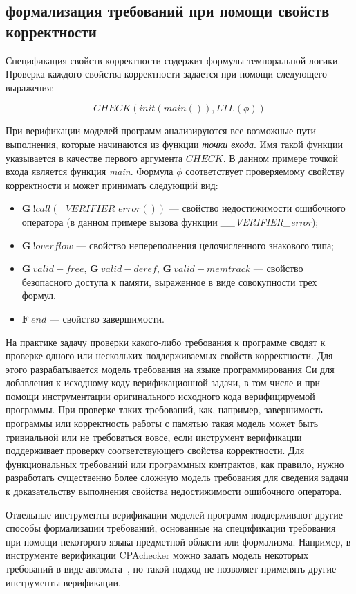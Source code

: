 \subsection{формализация требований при помощи свойств корректности}
Спецификация свойств корректности содержит формулы темпоральной логики.
Проверка каждого свойства корректности задается при помощи следующего выражения:

\[CHECK( init(main()), LTL(\phi) )\]

При верификации моделей программ анализируются все возможные пути выполнения, которые начинаются из функции \textit{точки входа}.
Имя такой функции указывается в качестве первого аргумента $CHECK$.
В данном примере точкой входа является функция \textit{main}.
Формула $\phi$ соответствует проверяемому свойству корректности и может принимать следующий вид:
\begin{itemize}
\item $\mathbf{G}~!call(\_\_VERIFIER\_error())$ --- свойство недостижимости ошибочного оператора (в данном примере вызова функции \textit{\_\_VERIFIER\_error});
\item $\mathbf{G}~!overflow$ --- свойство непереполнения целочисленного знакового типа;
\item $\mathbf{G}~valid-free$, $\mathbf{G}~valid-deref$, $\mathbf{G}~valid-memtrack$ --- свойство безопасного доступа к памяти, выраженное в виде совокупности трех формул.
\item $\mathbf{F}~end$ --- свойство завершимости.
\end{itemize}

На практике задачу проверки какого-либо требования к программе сводят к проверке одного или нескольких поддерживаемых свойств корректности.
Для этого разрабатывается модель требования на языке программирования Си для добавления к исходному коду верификационной задачи, в том числе и при помощи инструментации оригинального исходного кода верифицируемой программы.
При проверке таких требований, как, например, завершимость программы или корректность работы с памятью такая модель может быть тривиальной или не требоваться вовсе, если инструмент верификации поддерживает проверку соответствующего свойства корректности.
Для функциональных требований или программных контрактов, как правило, нужно разработать существенно более сложную модель требования для сведения задачи к доказательству выполнения свойства недостижимости ошибочного оператора.

Отдельные инструменты верификации моделей программ поддерживают другие способы формализации требований, основанные на спецификации требования при помощи некоторого языка предметной области или формализма.
Например, в инструменте верификации CPAchecker можно задать модель некоторых требований в виде автомата~\cite{Apel:2016}, но такой подход не позволяет применять другие инструменты верификации.

